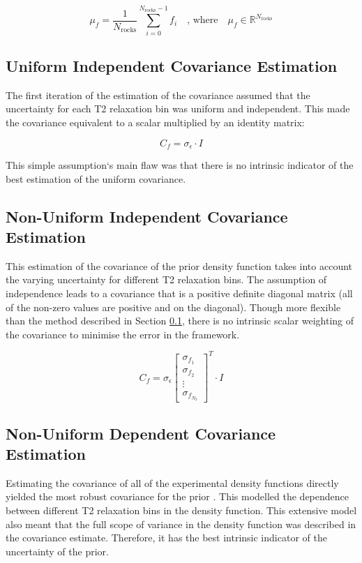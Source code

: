 \begin{equation}
    \label{eq:mean_estimation_prior}
    \mu_f = \frac{1}{N_\text{rocks}} \sum^{N_\text{rocks}-1}_{i=0} f_i \quad \text{, where} \quad \mu_f \in \mathbb{R}^{N_{\text{rocks}}}
\end{equation}

\subsection{Uniform Independent Covariance Estimation}\label{section:uniformIndependentCovar}
The first iteration of the estimation of the covariance assumed that the uncertainty for each T2 relaxation bin was uniform and independent. This made the covariance equivalent to a scalar multiplied by an identity matrix:

\begin{equation}
    \label{eq:uniform_diagonal_covar}
    C_f = \sigma_\epsilon \cdot I
\end{equation}

This simple assumption`s main flaw was that there is no intrinsic indicator of the best estimation of the uniform covariance.

\subsection{Non-Uniform Independent Covariance Estimation}
This estimation of the covariance of the prior density function takes into account the varying uncertainty for different T2 relaxation bins. The assumption of independence leads to a covariance that is a positive definite diagonal matrix (all of the non-zero values are positive and on the diagonal). Though more flexible than the method described in Section \ref{section:uniformIndependentCovar}, there is no intrinsic scalar weighting of the covariance to minimise the error in the framework. 

\begin{equation}
    \label{eq:nonuniform_diagonal_covar}
    C_f = \sigma_\epsilon     
    \begin{bmatrix}
    \sigma_{f_1}  \\
    \sigma_{f_2} \\
    \vdots \\
    \sigma_{f_{N_2}}
    \end{bmatrix} ^ T
    \cdot  I
\end{equation}


\subsection{Non-Uniform Dependent Covariance Estimation}
Estimating the covariance of all of the experimental density functions directly yielded the most robust covariance for the prior \cite{DiscreteRandomSignalsBookCovarianceEst}. This modelled the dependence between different T2 relaxation bins in the density function. This extensive model also meant that the full scope of variance in the density function was described in the covariance estimate. Therefore, it has the best intrinsic indicator of the uncertainty of the prior.

